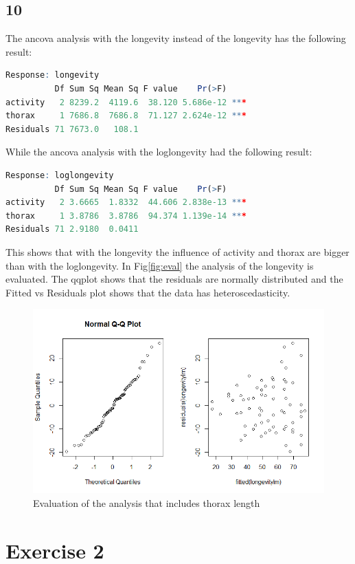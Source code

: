 \documentclass{article}
\begin{document}
    \subsection*{10}
      The ancova analysis with the longevity instead of the longevity has the following result:
      \begin{lstlisting}[language=R]
Response: longevity
          Df Sum Sq Mean Sq F value    Pr(>F)    
activity   2 8239.2  4119.6  38.120 5.686e-12 ***
thorax     1 7686.8  7686.8  71.127 2.624e-12 ***
Residuals 71 7673.0   108.1    
      \end{lstlisting}
      While the ancova analysis with the loglongevity had the following result:
      \begin{lstlisting}[language=R]
Response: loglongevity
          Df Sum Sq Mean Sq F value    Pr(>F)    
activity   2 3.6665  1.8332  44.606 2.838e-13 ***
thorax     1 3.8786  3.8786  94.374 1.139e-14 ***
Residuals 71 2.9180  0.0411             
      \end{lstlisting}
      This shows that with the longevity the influence of activity and thorax are bigger than with the loglongevity.
      In Fig\ref{fig:eval} the analysis of the longevity is evaluated.
      The qqplot shows that the residuals are normally distributed and the Fitted vs Residuals plot shows that the data has heteroscedasticity.
      \begin{figure}[H]
          \centering
          \includegraphics[scale=0.3]{../results/evalLongevity.png}
          \caption{Evaluation of the analysis that includes thorax length}
          \label{fig:evalLongevity}
      \end{figure}
    
  \section*{Exercise 2}
\end{document}
